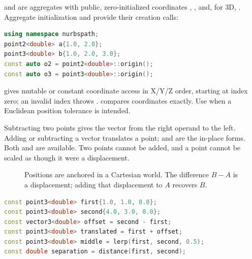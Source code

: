  and  are aggregates with public,
zero-initialized coordinates , , and, for 3D, .
Aggregate initialization and  provide their creation calls:

\begin{lstlisting}[language=C++]
using namespace nurbspath;
point2<double> a{1.0, 2.0};
point3<double> b{1.0, 2.0, 3.0};
const auto o2 = point2<double>::origin();
const auto o3 = point3<double>::origin();
\end{lstlisting}

 gives mutable or constant coordinate access in X/Y/Z
order, starting at index zero; an invalid index throws
.  compares coordinates exactly.
Use  when a Euclidean position
tolerance is intended.

Subtracting two points gives the vector from the right operand to the left.
Adding or subtracting a vector translates a point; \api{+=} and \api{-=}
are the in-place forms. Both  and
 are available. Two points cannot be added, and a point
cannot be scaled as though it were a displacement.

\begin{figure}[htbp]
\centering
{}
\caption{Positions are anchored in a Cartesian world. The difference $B-A$
is a displacement; adding that displacement to $A$ recovers $B$.}
\label{fig:point-displacement}
\end{figure}

\begin{lstlisting}[language=C++]
const point3<double> first{1.0, 1.0, 0.0};
const point3<double> second{4.0, 3.0, 0.0};
const vector3<double> offset = second - first;
const point3<double> translated = first + offset;
const point3<double> middle = lerp(first, second, 0.5);
const double separation = distance(first, second);
\end{lstlisting}

